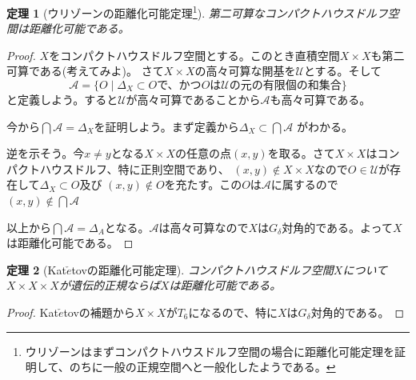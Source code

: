 \documentclass[leqno]{jsarticle}
\newtheorem{thm}{定理}
\begin{document}
\begin{thm}[ウリゾーンの距離化可能定理\footnote{ウリゾーンはまずコンパクトハウスドルフ空間の場合に距離化可能定理を証明して、のちに一般の正規空間へと一般化したようである。}]
第二可算なコンパクトハウスドルフ空間は距離化可能である。
\end{thm}
\begin{proof}
$X$をコンパクトハウスドルフ空間とする。このとき直積空間$X\times X$も第二可算である(考えてみよ)。
さて$X\times X$の高々可算な開基を$\mathcal{U}$とする。そして
\[
\mathcal{A}=\{O\mid \text{$\Delta_X\subset O$で、かつ$O$は$\mathcal{U}$の元の有限個の和集合}\}
\]
と定義しよう。すると$\mathcal{U}$が高々可算であることから$\mathcal{A}$も高々可算である。\par
今から$\bigcap\mathcal{A}=\Delta_X$を証明しよう。まず定義から$\Delta_X\subset \bigcap\mathcal{A}$ がわかる。\par
逆を示そう。今$x\neq y$となる$X\times X$の任意の点$(x,y)$を取る。さて$X\times X$はコンパクトハウスドルフ、特に正則空間であり、
$(x,y)\not\in X\times X$なので$O\in \mathcal{U}$が存在して$\Delta_X\subset O$及び
$(x,y)\not\in O$を充たす。この$O$は$\mathcal{A}$に属するので$(x,y)\not\in \bigcap\mathcal{A}$\par
以上から$\bigcap\mathcal{A}=\Delta_A$となる。$\mathcal{A}$は高々可算なので$X$は$G_{\delta}$対角的である。よって$X$は距離化可能である。
\end{proof}

\begin{thm}[Kat$\check{e}$tovの距離化可能定理]
コンパクトハウスドルフ空間$X$について$X\times X\times X$が遺伝的正規ならば$X$は距離化可能である。
\end{thm}
\begin{proof}
Kat$\check{e}$tovの補題から$X\times X$が$T_6$になるので、特に$X$は$G_{\delta}$対角的である。
\end{proof}













			
\end{document}

